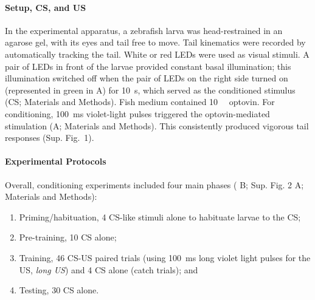 \paragraph{Setup, CS, and US}
In the experimental apparatus, a zebrafish larva was head-restrained in an agarose gel, with its eyes and tail free to move. Tail kinematics were recorded by automatically tracking the tail.
White or red LEDs were used as visual stimuli. A pair of LEDs in front of the larvae provided constant basal illumination; this illumination switched off when the pair of LEDs on the right side turned on (represented in green in A) for \SI{10}{\second}, which served as the conditioned stimulus (CS; Materials and Methods).
Fish medium contained \SI{10}{\micro\Molar} optovin. For conditioning, \SI{100}{\milli\second} violet-light pulses triggered the optovin-mediated stimulation (A; Materials and Methods). This consistently produced vigorous tail responses (Sup. Fig.~1).

\paragraph{Experimental Protocols}
Overall, conditioning experiments included four main phases ( B; Sup. Fig. 2 A; Materials and Methods):
\begin{enumerate}
  \item Priming/habituation, 4 CS-like stimuli alone to habituate larvae to the CS;
  \item Pre-training, 10 CS alone;
  \item Training, 46 CS-US paired trials (using \SI{100}{\milli\second} long violet light pulses for the US, \textit{long US}) and 4 CS alone (catch trials); and
  \item Testing, 30 CS alone.
\end{enumerate}

